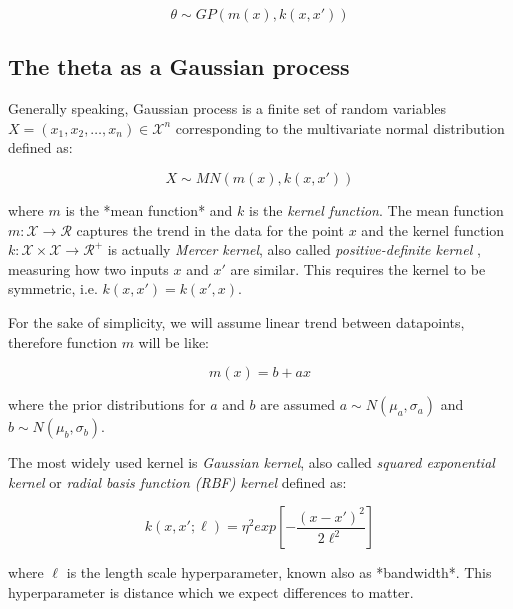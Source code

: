 \documentclass[
  digital, %
  table,   %
  twoside, %
  12pt,
  lof,     %
  lot,     %
]{fithesis3}
\begin{document}
\begin{equation}
\theta \sim GP \left( m \left( x \right), k \left( x, x' \right) \right)
\end{equation}

\subsection{The theta as a Gaussian process}

Generally speaking, Gaussian process 
\cite{rasmussen2004} is a finite set of random 
variables 
$X = (x_1, x_2, \dots, x_n) \in \mathcal{X}^n$ 
corresponding to the multivariate normal 
distribution defined as:

\begin{equation}
X \sim MN \left( m \left( x \right), k \left( x, x' \right) \right)
\end{equation}

where $m$ is the *mean function* and $k$ is the 
\textit{kernel function}. 
The mean function 
$m : \mathcal{X} \to \mathcal{R}$ captures the 
trend in the data for the point $x$ and the 
kernel function 
$k : \mathcal{X} \times \mathcal{X} \to \mathcal{R}^{+}$ 
is actually \textit{Mercer kernel}, also called 
\textit{positive-definite kernel} \cite{murphy2021}, 
measuring how two inputs $x$ and $x'$ are similar. 
This requires the kernel to be symmetric, i.e. 
$k \left( x, x' \right) = k \left( x', x \right)$.

For the sake of simplicity, we will assume linear 
trend between datapoints, therefore function 
$m$ will be like:

\begin{equation}
m(x) = b + a x
\end{equation}

where the prior distributions for $a$ and $b$ 
are assumed 
$a \sim N \left( \mu_a, \sigma_a \right)$ and 
$b \sim N \left( \mu_b, \sigma_b \right)$.

The most widely used kernel is \textit{Gaussian kernel}, 
also called \textit{squared exponential kernel} or 
\textit{radial basis function (RBF) kernel} defined as:

\begin{equation}
k \left( x, x'; \ell \right) = \eta^2 exp \left[ -\frac{(x - x')^2}{2\ell^2} \right]
\end{equation}

where $\ell$ is the length scale hyperparameter, 
known also as *bandwidth*. 
This hyperparameter is distance which we expect 
differences to matter.
\end{document}
